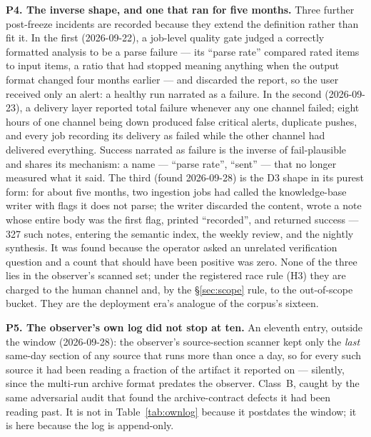 \documentclass[11pt]{article}
\begin{document}
\textbf{P4. The inverse shape, and one that ran for five months.} Three
further post-freeze incidents are recorded because they extend the
definition rather than fit it. In the first (2026-09-22), a job-level
quality gate judged a correctly formatted analysis to be a parse failure
--- its ``parse rate'' compared rated items to input items, a ratio that
had stopped meaning anything when the output format changed four months
earlier --- and discarded the report, so the user received only an
alert: a healthy run narrated as a failure. In the second (2026-09-23),
a delivery layer reported total failure whenever any one channel failed;
eight hours of one channel being down produced false critical alerts,
duplicate pushes, and every job recording its delivery as failed while
the other channel had delivered everything. Success narrated as failure
is the inverse of fail-plausible and shares its mechanism: a name ---
``parse rate'', ``sent'' --- that no longer measured what it said. The
third (found 2026-09-28) is the D3 shape in its purest form: for about
five months, two ingestion jobs had called the knowledge-base writer with
flags it does not parse; the writer discarded the content, wrote a note
whose entire body was the first flag, printed ``recorded'', and returned
success --- 327 such notes, entering the semantic index, the weekly
review, and the nightly synthesis. It was found because the operator
asked an unrelated verification question and a count that should have
been positive was zero. None of the three lies in the observer's scanned
set; under the registered race rule (H3) they are charged to the human
channel and, by the \S\ref{sec:scope} rule, to the out-of-scope bucket.
They are the deployment era's analogue of the corpus's sixteen.

\textbf{P5. The observer's own log did not stop at ten.} An eleventh
entry, outside the window (2026-09-28): the observer's source-section
scanner kept only the \emph{last} same-day section of any source that
runs more than once a day, so for every such source it had been reading
a fraction of the artifact it reported on --- silently, since the
multi-run archive format predates the observer. Class~B, caught by the
same adversarial audit that found the archive-contract defects it had
been reading past. It is not in Table~\ref{tab:ownlog} because it
postdates the window; it is here because the log is append-only.
\end{document}
